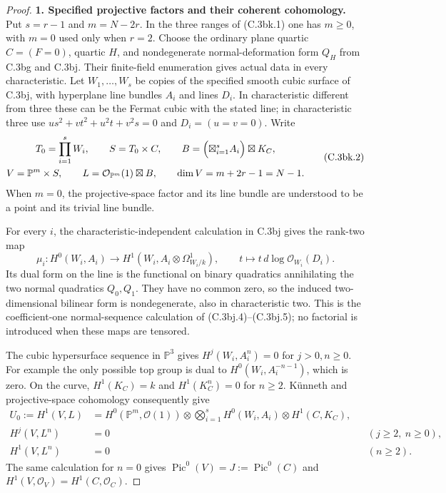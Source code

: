 \begin{proof}
\textbf{1. Specified projective factors and their coherent cohomology.}
Put $s=r-1$ and $m=N-2r$. In the three ranges of (C.3bk.1) one has
$m\ge0$, with $m=0$ used only when $r=2$.
Choose the ordinary plane quartic $C=(F=0)$, quartic $H$, and
nondegenerate normal-deformation form $Q_H$ from C.3bg and C.3bj.
Their finite-field enumeration gives actual data in every
characteristic. Let $W_1,\ldots,W_s$ be copies of the specified
smooth cubic surface of C.3bj, with hyperplane line bundles $A_i$
and lines $D_i$. In characteristic different from three these can
be the Fermat cubic with the stated line; in characteristic three
use $u s^2+v t^2+u^2t+v^2s=0$ and $D_i=(u=v=0)$.
Write
\[
 \begin{gathered}
 T_0=\prod_{i=1}^s W_i,\qquad S=T_0\times C,\qquad
 B=\Bigl(\boxtimes_{i=1}^s A_i\Bigr)\boxtimes K_C,\\
 V=\mathbb P^m\times S,\qquad
 L=\mathcal O_{\mathbb P^m}(1)\boxtimes B,
 \qquad \dim V=m+2r-1=N-1.
 \end{gathered}
 \tag{C.3bk.2}
\]
When $m=0$, the projective-space factor and its line bundle are
understood to be a point and its trivial line bundle.

For every $i$, the characteristic-independent calculation in
C.3bj gives the rank-two map
\[
 \mu_i:H^0(W_i,A_i)\longrightarrow
     H^1(W_i,A_i\otimes\Omega^1_{W_i/k}),
 \qquad t\longmapsto t\,d\log\mathcal O_{W_i}(D_i).
 \tag{C.3bk.3}
\]
Its dual form on the line is the functional on binary quadratics
annihilating the two normal quadratics $Q_0,Q_1$. They have no common
zero, so the induced two-dimensional bilinear form is nondegenerate,
also in characteristic two. This is the coefficient-one normal-sequence
calculation of (C.3bj.4)--(C.3bj.5); no factorial is introduced when
these maps are tensored.

The cubic hypersurface sequence in $\mathbb P^3$ gives
$H^j(W_i,A_i^n)=0$ for $j>0,n\ge0$. For example the only possible
top group is dual to $H^0(W_i,A_i^{-n-1})$, which is zero.
On the curve, $H^1(K_C)=k$ and $H^1(K_C^n)=0$ for $n\ge2$.
K\"unneth and projective-space cohomology consequently give
\[
 \begin{aligned}
 U_0:=H^1(V,L)
   &=H^0(\mathbb P^m,\mathcal O(1))
       \otimes\bigotimes_{i=1}^s H^0(W_i,A_i)
       \otimes H^1(C,K_C),\\
 H^j(V,L^n)&=0&& (j\ge2,\ n\ge0),\\
 H^1(V,L^n)&=0&& (n\ge2).
 \end{aligned}
 \tag{C.3bk.4}
\]
The same calculation for $n=0$ gives
$\operatorname{Pic}^0(V)=J:=\operatorname{Pic}^0(C)$ and
$H^1(V,\mathcal O_V)=H^1(C,\mathcal O_C)$.


\end{proof}
